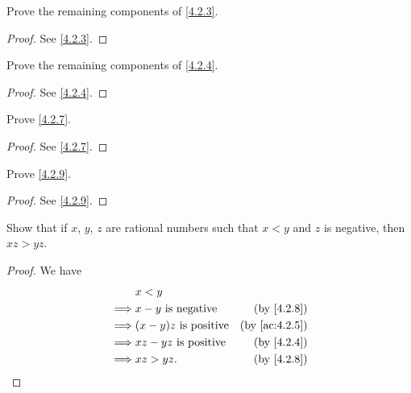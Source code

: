 \begin{ex}\label{ex:4.2.2}
  Prove the remaining components of \cref{4.2.3}.
\end{ex}

\begin{proof}
  See \cref{4.2.3}.
\end{proof}

\begin{ex}\label{ex:4.2.3}
  Prove the remaining components of \cref{4.2.4}.
\end{ex}

\begin{proof}
  See \cref{4.2.4}.
\end{proof}

\begin{ex}\label{ex:4.2.4}
  Prove \cref{4.2.7}.
\end{ex}

\begin{proof}
  See \cref{4.2.7}.
\end{proof}

\begin{ex}\label{ex:4.2.5}
  Prove \cref{4.2.9}.
\end{ex}

\begin{proof}
  See \cref{4.2.9}.
\end{proof}

\begin{ex}\label{ex:4.2.6}
  Show that if \(x\), \(y\), \(z\) are rational numbers such that \(x < y\) and \(z\) is negative, then \(xz > yz\).
\end{ex}

\begin{proof}
  We have
  \begin{align*}
             & x < y                                                      \\
    \implies & x - y \text{ is negative}    & \text{(by \cref{4.2.8})}    \\
    \implies & (x - y)z \text{ is positive} & \text{(by \cref{ac:4.2.5})} \\
    \implies & xz - yz \text{ is positive}  & \text{(by \cref{4.2.4})}    \\
    \implies & xz > yz.                     & \text{(by \cref{4.2.8})}
  \end{align*}
\end{proof}